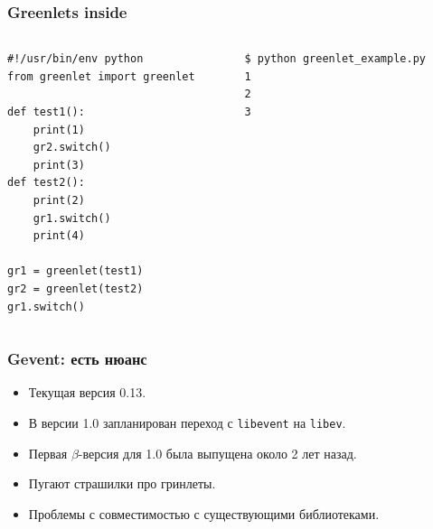 \documentclass[aspectratio=169]{beamer}
\begin{document}
\begin{frame}[fragile]
  \frametitle{Greenlets inside}

  \begin{columns}
    \begin{column}{.48\textwidth}
      \begin{lstlisting}[caption=greenlet\_example.py]
#!/usr/bin/env python
from greenlet import greenlet

def test1():
    print(1)
    gr2.switch()
    print(3)
def test2():
    print(2)
    gr1.switch()
    print(4)

gr1 = greenlet(test1)
gr2 = greenlet(test2)
gr1.switch()
      \end{lstlisting}

    \end{column}%
    \hfill%
    
    \begin{column}{.48\textwidth}
      \begin{lstlisting}[numbers=none]
$ python greenlet_example.py 
1
2
3
      \end{lstlisting}

    \end{column}%
  \end{columns}

\end{frame}


\begin{frame}
  \frametitle{Gevent: есть нюанс}
  \begin{itemize}
  \item Текущая версия 0.13.
  \item В версии 1.0 запланирован переход с {\tt libevent} на {\tt libev}.
    \pause
  \item Первая $\beta$-версия для 1.0 была выпущена около 2 лет назад.
    \pause
  \item Пугают страшилки про гринлеты.
    \pause
  \item Проблемы с совместимостью с существующими библиотеками.
  \end{itemize}
\end{frame}
\end{document}
